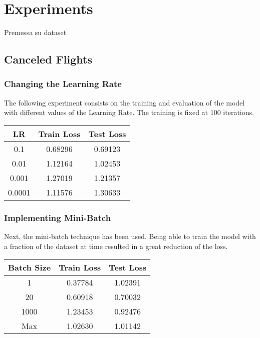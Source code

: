\documentclass[
	letterpaper, %
	10pt, %
]{class}
\begin{document}

\section{Experiments}

Premessa su dataset

\subsection{Canceled Flights}

\subsubsection{Changing the Learning Rate}

The following experiment consists on the training and evaluation of the model with different values of the Learning Rate. The training is fixed at 100 iterations.

\begin{center}
	\begin{tabular}{ |c|c|c| }
		\hline
		LR     & Train Loss & Test Loss \\
		\hline
		0.1    & 0.68296    & 0.69123   \\
		0.01   & 1.12164    & 1.02453   \\
		0.001  & 1.27019    & 1.21357   \\
		0.0001 & 1.11576    & 1.30633   \\
		\hline
	\end{tabular}
\end{center}



\subsubsection{Implementing Mini-Batch}

Next, the mini-batch technique has been used. Being able to train the model with a fraction of the dataset at time resulted in a great reduction of the loss.

\begin{center}
	\begin{tabular}{ |c|c|c| }
		\hline
		Batch Size & Train Loss & Test Loss \\
		\hline
		1          & 0.37784    & 1.02391   \\
		20         & 0.60918    & 0.70032   \\
		1000       & 1.23453    & 0.92476   \\
		Max        & 1.02630    & 1.01142   \\
		\hline
	\end{tabular}
\end{center}
\end{document}
